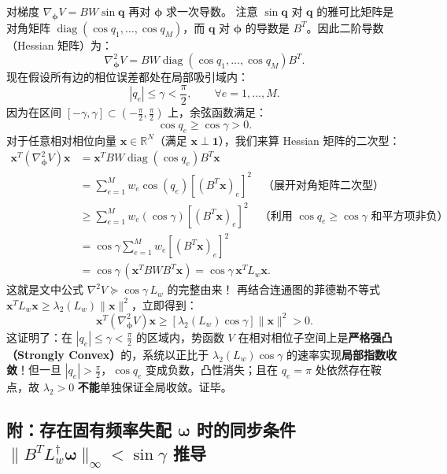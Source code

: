 \documentclass[UTF8, a4paper, 11pt]{ctexart}
\newcommand{\R}{\mathbb{R}}
\DeclareMathOperator{\diag}{diag}
\begin{document}
\begin{proofbox}
对梯度 $\nabla_{\bm{\phi}} V = B W \sin\bm{q}$ 再对 $\bm{\phi}$ 求一次导数。
注意 $\sin\bm{q}$ 对 $\bm{q}$ 的雅可比矩阵是对角矩阵 $\diag(\cos q_1, \dots, \cos q_M)$，而 $\bm{q}$ 对 $\bm{\phi}$ 的导数是 $B^T$。因此二阶导数（Hessian 矩阵）为：
\[
    \nabla_{\bm{\phi}}^2 V = B W \diag(\cos q_1, \dots, \cos q_M) B^T.
\]
现在假设所有边的相位误差都处在局部吸引域内：
\[
    |q_e| \le \gamma < \frac{\pi}{2}, \qquad \forall e = 1, \dots, M.
\]
因为在区间 $[-\gamma, \gamma] \subset (-\frac{\pi}{2}, \frac{\pi}{2})$ 上，余弦函数满足：
\[
    \cos q_e \ge \cos\gamma > 0.
\]
对于任意相对相位向量 $\bm{x} \in \R^N$（满足 $\bm{x} \perp \bm{1}$），我们来算 Hessian 矩阵的二次型：
\begin{align*}
    \bm{x}^T \left(\nabla_{\bm{\phi}}^2 V\right) \bm{x} &= \bm{x}^T B W \diag(\cos q_e) B^T \bm{x} \\
    &= \sum_{e=1}^M w_e \cos(q_e) \left[(B^T \bm{x})_e\right]^2 \quad \text{（展开对角矩阵二次型）}\\
    &\ge \sum_{e=1}^M w_e (\cos\gamma) \left[(B^T \bm{x})_e\right]^2 \quad \text{（利用 $\cos q_e \ge \cos\gamma$ 和平方项非负）}\\
    &= \cos\gamma \sum_{e=1}^M w_e \left[(B^T \bm{x})_e\right]^2 \\
    &= \cos\gamma \, \left(\bm{x}^T B W B^T \bm{x}\right) = \cos\gamma \, \bm{x}^T L_w \bm{x}.
\end{align*}
这就是文中公式 $\nabla^2 V \succeq \cos\gamma\, L_w$ 的完整由来！
再结合连通图的菲德勒不等式 $\bm{x}^T L_w \bm{x} \ge \lambda_2(L_w)\|\bm{x}\|^2$，立即得到：
\[
    \boxed{
    \bm{x}^T \left(\nabla_{\bm{\phi}}^2 V\right) \bm{x} \ge \left[\lambda_2(L_w)\cos\gamma\right] \|\bm{x}\|^2 > 0.
    }
\]
这证明了：在 $|q_e| \le \gamma < \frac{\pi}{2}$ 的区域内，势函数 $V$ 在相对相位子空间上是\textbf{严格强凸（Strongly Convex）}的，系统以正比于 $\lambda_2(L_w)\cos\gamma$ 的速率实现\textbf{局部指数收敛}！但一旦 $|q_e| > \frac{\pi}{2}$，$\cos q_e$ 变成负数，凸性消失；且在 $q_e = \pi$ 处依然存在鞍点，故 $\lambda_2 > 0$ \textbf{不能}单独保证全局收敛。证毕。
\end{proofbox}

\subsection{附：存在固有频率失配 \texorpdfstring{$\bm{\omega}$}{omega} 时的同步条件 \texorpdfstring{$\|B^T L_w^\dagger \bm{\omega}\|_\infty < \sin\gamma$}{||B^T Lw^+ omega||_inf < sin(gamma)} 推导}
\end{document}

